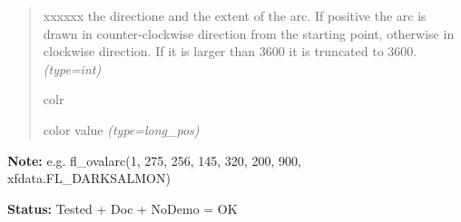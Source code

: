 \begin{boxedminipage}{\funcwidth}
\begin{quote}
\begin{Ventry}{xxxxxx}
the directione and the extent of the arc. If positive the arc is
drawn in counter-clockwise direction from the starting point,
otherwise in clockwise direction. If it is larger than 3600 it is
truncated to 3600.
            {\it (type=int)}

          \item[colr]


color value
            {\it (type=long\_pos)}

        \end{Ventry}

      \end{quote}

\textbf{Note:} 
e.g. fl\_ovalarc(1, 275, 256, 145, 320, 200, 900,
xfdata.FL\_DARKSALMON)


\textbf{Status:} 
Tested + Doc + NoDemo = OK


    \end{boxedminipage}

    \label{xformslib:flxbasic:fl_ovalf}

    \vspace{0.5ex}

